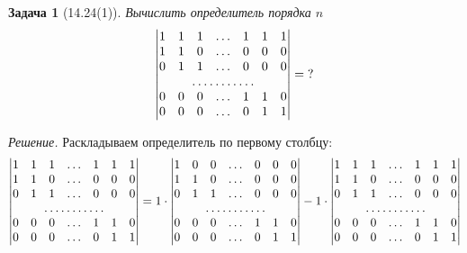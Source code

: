 \documentclass[a4paper,12pt]{article}
\newtheorem*{problem}{Задача}
\theoremstyle{definition}
\theoremstyle{remark}
\theoremstyle{remark}
\begin{document}
  \begin{problem}[14.24(1)]
    Вычислить определитель порядка $n$
    \[
      \begin{vmatrix}
        1 & 1 & 1 & \ldots & 1 & 1 & 1\\
        1 & 1 & 0 & \ldots & 0 & 0 & 0\\
        0 & 1 & 1 & \ldots & 0 & 0 & 0\\
        \hdotsfor{7}\\
        0 & 0 & 0 & \ldots & 1 & 1 & 0\\
        0 & 0 & 0 & \ldots & 0 & 1 & 1
      \end{vmatrix} = \?
    \]
  \end{problem}
  
  \emph{Решение.}
  Раскладываем определитель по первому столбцу:
  \[
    \begin{vmatrix}
      1 & 1 & 1 & \ldots & 1 & 1 & 1\\
      1 & 1 & 0 & \ldots & 0 & 0 & 0\\
      0 & 1 & 1 & \ldots & 0 & 0 & 0\\
      \hdotsfor{7}\\
      0 & 0 & 0 & \ldots & 1 & 1 & 0\\
      0 & 0 & 0 & \ldots & 0 & 1 & 1
    \end{vmatrix}
    = 1 \cdot \begin{vmatrix}
        1 & 0 & 0 & \ldots & 0 & 0 & 0\\
        1 & 1 & 0 & \ldots & 0 & 0 & 0\\
        0 & 1 & 1 & \ldots & 0 & 0 & 0\\
        \hdotsfor{7}\\
        0 & 0 & 0 & \ldots & 1 & 1 & 0\\
        0 & 0 & 0 & \ldots & 0 & 1 & 1
      \end{vmatrix}
      - 1 \cdot \begin{vmatrix}
        1 & 1 & 1 & \ldots & 1 & 1 & 1\\
        1 & 1 & 0 & \ldots & 0 & 0 & 0\\
        0 & 1 & 1 & \ldots & 0 & 0 & 0\\
        \hdotsfor{7}\\
        0 & 0 & 0 & \ldots & 1 & 1 & 0\\
        0 & 0 & 0 & \ldots & 0 & 1 & 1
      \end{vmatrix}
  \]
  
\end{document}
